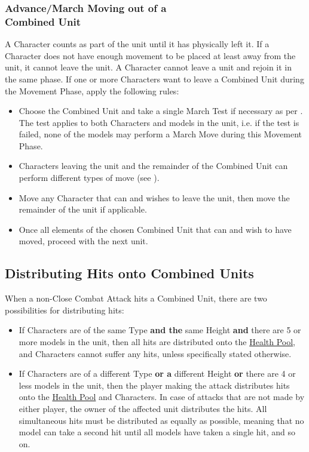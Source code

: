 \subsubsection[Advance/March Moving out of a Combined Unit]{Advance/March Moving out of a\\ Combined Unit}

A Character counts as part of the unit until it has physically left it. If a Character does not have enough movement to be placed at least  away from the unit, it cannot leave the unit. A Character cannot leave a unit and rejoin it in the same phase. If one or more Characters want to leave a Combined Unit during the Movement Phase, apply the following rules:

\begin{itemize}
	\item Choose the Combined Unit and take a single March Test if necessary as per . The test applies to both Characters and \rnf{} models in the unit, i.e. if the test is failed, none of the models may perform a March Move during this Movement Phase.
	\item Characters leaving the unit and the remainder of the Combined Unit can perform different types of move (see ).
	\item Move any Character that can and wishes to leave the unit, then move the remainder of the unit if applicable.
	\item Once all elements of the chosen Combined Unit that can and wish to have moved, proceed with the next unit.
\end{itemize}

\subsection{Distributing Hits onto Combined Units}

When a non-Close Combat Attack hits a Combined Unit, there are two possibilities for distributing hits:

\begin{itemize}
	\item If Characters are of the same Type \textbf{and the} same Height \textbf{and} there are 5 or more \rnf{} models in the unit, then all hits are distributed onto the \rnf{} \hyperref[health_pools]{Health Pool}, and Characters cannot suffer any hits, unless specifically stated otherwise.
	\item If Characters are of a different Type \textbf{or a} different Height \textbf{or} there are 4 or less \rnf{} models in the unit, then the player making the attack distributes hits onto the \rnf{} \hyperref[health_pools]{Health Pool} and Characters. In case of attacks that are not made by either player, the owner of the affected unit distributes the hits. All simultaneous hits must be distributed as equally as possible, meaning that no model can take a second hit until all models have taken a single hit, and so on.
\end{itemize}


